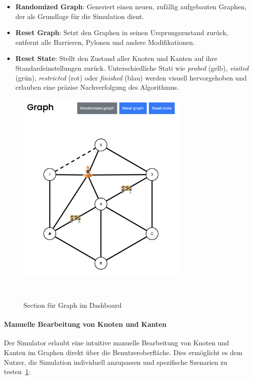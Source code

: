 \documentclass[main.tex]{subfiles} %
\begin{document}
\begin{itemize}
  \item \textbf{Randomized Graph}:
    Generiert einen neuen, zufällig aufgebauten Graphen, der als
    Grundlage für die Simulation dient.

  \item \textbf{Reset Graph}:
    Setzt den Graphen in seinen Ursprungszustand zurück, entfernt
    alle Barrieren, Pylonen und andere Modifikationen.

  \item \textbf{Reset State}:
    Stellt den Zustand aller Knoten und Kanten auf ihre
    Standardeinstellungen zurück. Unterschiedliche Stati wie
    \emph{probed} (gelb), \emph{visited} (grün), \emph{restricted}
    (rot) oder \emph{finished} (blau) werden visuell hervorgehoben
    und erlauben eine präzise Nachverfolgung des Algorithmus.
\end{itemize}

\begin{figure}[H]
  \centering
  \includegraphics[width=0.75\textwidth]{./fig_Simulation/Graph.png}
  \caption{Section für Graph im Dashboard}~\label{fig:DashboardGraph}
\end{figure}

\paragraph{Manuelle Bearbeitung von Knoten und Kanten}

Der Simulator erlaubt eine intuitive manuelle Bearbeitung von Knoten
und Kanten im Graphen direkt über die Benutzeroberfläche. Dies
ermöglicht es dem Nutzer, die Simulation individuell anzupassen und
spezifische Szenarien zu testen~\ref{fig:DashboardGraph}:
\end{document}

